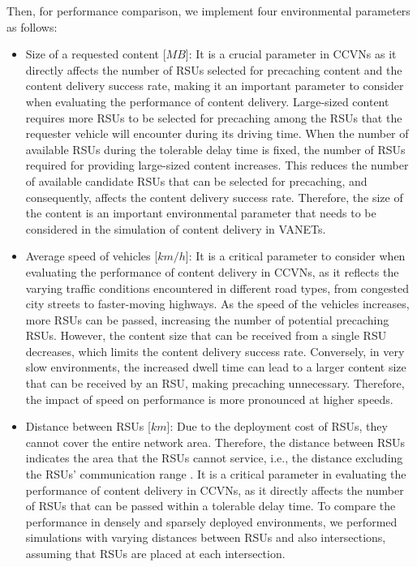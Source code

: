 \documentclass{ieeeaccess}
\begin{document}
Then, for performance comparison, we implement four environmental parameters as follows:
\begin{itemize}
    \item Size of a requested content [$MB$]:
        It is a crucial parameter in CCVNs as it directly affects the number of RSUs selected for precaching content and the content delivery success rate, making it an important parameter to consider when evaluating the performance of content delivery.
        Large-sized content requires more RSUs to be selected for precaching among the RSUs that the requester vehicle will encounter during its driving time.
        When the number of available RSUs during the tolerable delay time is fixed, the number of RSUs required for providing large-sized content increases.
        This reduces the number of available candidate RSUs that can be selected for precaching, and consequently, affects the content delivery success rate.
        Therefore, the size of the content is an important environmental parameter that needs to be considered in the simulation of content delivery in VANETs.
    \item Average speed of vehicles [$km/h$]:
        It is a critical parameter to consider when evaluating the performance of content delivery in CCVNs, as it reflects the varying traffic conditions encountered in different road types, from congested city streets to faster-moving highways.
        As the speed of the vehicles increases, more RSUs can be passed, increasing the number of potential precaching RSUs.
        However, the content size that can be received from a single RSU decreases, which limits the content delivery success rate.
        Conversely, in very slow environments, the increased dwell time can lead to a larger content size that can be received by an RSU, making precaching unnecessary. Therefore, the impact of speed on performance is more pronounced at higher speeds.
    \item Distance between RSUs [$km$]:
        Due to the deployment cost of RSUs, they cannot cover the entire network area.
        Therefore, the distance between RSUs indicates the area that the RSUs cannot service, i.e., the distance excluding the RSUs' communication range \cite{Nam2022, Wang2017}.
        It is a critical parameter in evaluating the performance of content delivery in CCVNs, as it directly affects the number of RSUs that can be passed within a tolerable delay time.
        To compare the performance in densely and sparsely deployed environments, we performed simulations with varying distances between RSUs and also intersections, assuming that RSUs are placed at each intersection.

\end{itemize}
\end{document}
